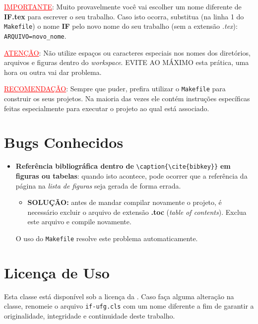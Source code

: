 \noindent
{}

\vspace{20pt}
\noindent
\textcolor{red}{\uline{IMPORTANTE}}: Muito provavelmente você vai escolher um nome diferente de \textbf{IF.tex} para escrever o seu trabalho. Caso isto ocorra, substitua (na linha 1 do \texttt{Makefile}) o nome \textbf{IF} pelo novo nome do seu trabalho (sem a extensão \emph{.tex}): \Verb+ARQUIVO=novo_nome+.
\vspace{20pt}

\noindent
\textcolor{red}{\uline{ATENÇÃO}}: Não utilize espaços ou caracteres especiais nos nomes dos diretórios, arquivos e figuras dentro do \emph{workspace}. EVITE AO MÁXIMO esta prática, uma hora ou outra vai dar problema.
\vspace{20pt}

\noindent
\textcolor{red}{\uline{RECOMENDAÇÃO}}: Sempre que puder, prefira utilizar o \texttt{Makefile} para construir os seus projetos. Na maioria das vezes ele contém instruções específicas feitas especialmente para executar o projeto ao qual está associado.
\vspace{20pt}

\section{Bugs Conhecidos}

\begin{itemize}
\item \textbf{Referência bibliográfica dentro de} \Verb+\caption{\cite{bibkey}}+ \textbf{em figuras ou tabelas}: quando isto acontece, pode ocorrer que a referência da página na \emph{lista de figuras} seja gerada de forma errada. 

\begin{itemize}
\item \textbf{SOLUÇÃO:} antes de mandar compilar novamente o projeto, é necessário excluir o arquivo de extensão \textbf{.toc} (\emph{table of contents}). Exclua este arquivo e compile novamente. 
\end{itemize}

O uso do \texttt{Makefile} resolve este problema automaticamente.
\end{itemize}

\section{Licença de Uso}

Esta classe está disponível sob a licença da . Caso faça alguma alteração na classe, renomeie o arquivo \texttt{if-ufg.cls} com um nome diferente a fim de garantir a originalidade, integridade e continuidade deste trabalho.
